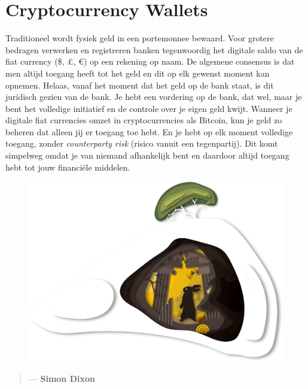 \chapter{Cryptocurrency Wallets}
\label{ch:wallets}

Traditioneel wordt fysiek geld in een portemonnee bewaard. Voor grotere bedragen verwerken en registreren banken tegenwoordig het digitale saldo van de fiat currency (\$, \pounds, \euro) op een rekening op naam. De algemene consensus is dat men altijd toegang heeft tot het geld en dit op elk gewenst moment kan opnemen. Helaas, vanaf het moment dat het geld op de bank staat, is dit juridisch gezien van de bank. Je hebt een vordering op de bank, dat wel, maar je bent het volledige initiatief en de controle over je eigen geld kwijt. Wanneer je digitale fiat currencies omzet in cryptocurrencies als Bitcoin, kun je geld zo beheren dat alleen jij er toegang toe hebt. En je hebt op elk moment volledige toegang, zonder \emph{counterparty risk} (risico vanuit een tegenpartij). Dit komt simpelweg omdat je van niemand afhankelijk bent en daardoor altijd toegang hebt tot jouw financi{\"e}le middelen. 

\begin{figure}
    \centering
    \includegraphics[width=\textwidth]{illustrations/resized_CRYPTO_KEY_1_PART_3.jpg}
\end{figure}

\begin{quotation}

      \textit{}
      \begin{flushright}
        \small{--- \textbf{Simon Dixon}}
      \end{flushright}
    
\end{quotation}

